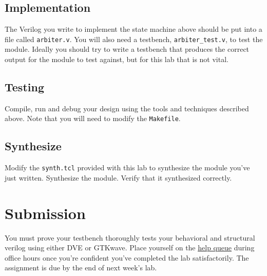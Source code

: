 \documentclass[dvipsnames]{article}
\begin{document}
\subsection{Implementation}
The Verilog you write to implement the state machine above should be put into a
file called \texttt{arbiter.v}. You will also need a testbench,
\texttt{arbiter\_test.v}, to test the module. Ideally you should try to write a
testbench that produces the correct output for the module to test against, but
for this lab that is not vital. 

\subsection{Testing}
Compile, run and debug your design using the tools and techniques described
above. Note that you will need to modify the \texttt{Makefile}. 

\subsection{Synthesize}
Modify the \texttt{synth.tcl} provided with this lab to synthesize the module
you've just written. Synthesize the module. Verify that it synthesized
correctly.

\section{Submission}
You must prove your testbench thoroughly tests your behavioral and structural verilog using either DVE or GTKwave. Place yourself on the \href{https://oh.eecs.umich.edu/courses/eecs470}{\underline{help queue}} during office hours once you're confident you've completed the lab satisfactorily. The assignment is due by the end of next week's lab.


\end{document}
